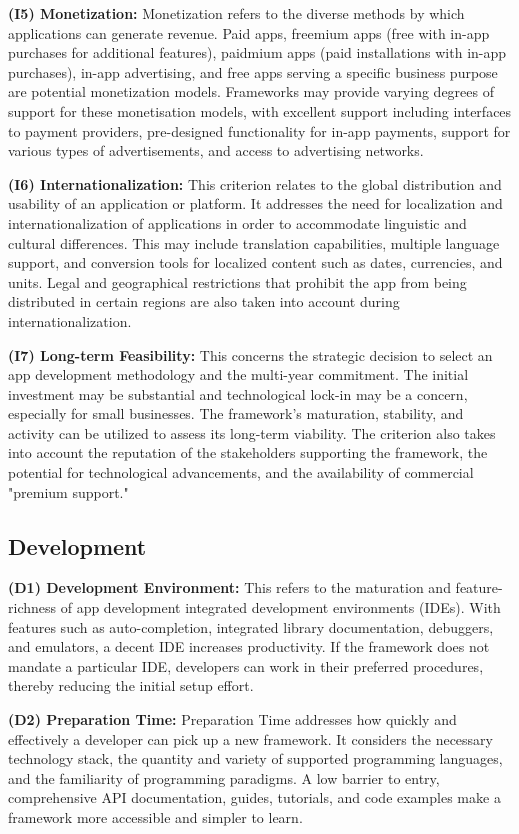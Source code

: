 \textbf{(I5) Monetization:}
Monetization refers to the diverse methods by which applications can generate revenue. Paid apps, freemium apps (free with in-app purchases for additional features), paidmium apps (paid installations with in-app purchases), in-app advertising, and free apps serving a specific business purpose are potential monetization models. Frameworks may provide varying degrees of support for these monetisation models, with excellent support including interfaces to payment providers, pre-designed functionality for in-app payments, support for various types of advertisements, and access to advertising networks.

\textbf{(I6) Internationalization:}
This criterion relates to the global distribution and usability of an application or platform. It addresses the need for localization and internationalization of applications in order to accommodate linguistic and cultural differences. This may include translation capabilities, multiple language support, and conversion tools for localized content such as dates, currencies, and units. Legal and geographical restrictions that prohibit the app from being distributed in certain regions are also taken into account during internationalization.

\textbf{(I7) Long-term Feasibility:}
This concerns the strategic decision to select an app development methodology and the multi-year commitment. The initial investment may be substantial and technological lock-in may be a concern, especially for small businesses. The framework's maturation, stability, and activity can be utilized to assess its long-term viability. The criterion also takes into account the reputation of the stakeholders supporting the framework, the potential for technological advancements, and the availability of commercial "premium support."

\subsection{Development}
\textbf{(D1) Development Environment:}
This refers to the maturation and feature-richness of app development integrated development environments (IDEs). With features such as auto-completion, integrated library documentation, debuggers, and emulators, a decent IDE increases productivity. If the framework does not mandate a particular IDE, developers can work in their preferred procedures, thereby reducing the initial setup effort.

\textbf{(D2) Preparation Time:}
Preparation Time addresses how quickly and effectively a developer can pick up a new framework. It considers the necessary technology stack, the quantity and variety of supported programming languages, and the familiarity of programming paradigms. A low barrier to entry, comprehensive API documentation, guides, tutorials, and code examples make a framework more accessible and simpler to learn.

